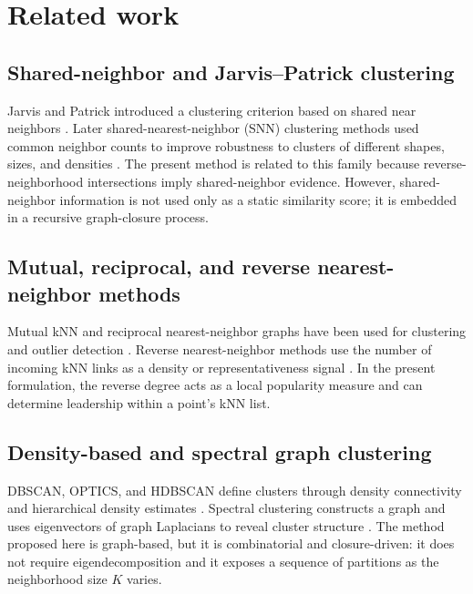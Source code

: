 \documentclass[pdflatex,sn-mathphys-num]{sn-jnl}
\theoremstyle{thmstyleone}
\theoremstyle{thmstyletwo}
\theoremstyle{thmstylethree}
\begin{document}
\section{Related work}\label{sec:related}

\subsection{Shared-neighbor and Jarvis--Patrick clustering}

Jarvis and Patrick introduced a clustering criterion based on shared near neighbors \citep{JarvisPatrick1973}. Later shared-nearest-neighbor (SNN) clustering methods used common neighbor counts to improve robustness to clusters of different shapes, sizes, and densities \citep{ErtozSteinbachKumar2003}. The present method is related to this family because reverse-neighborhood intersections imply shared-neighbor evidence. However, shared-neighbor information is not used only as a static similarity score; it is embedded in a recursive graph-closure process.

\subsection{Mutual, reciprocal, and reverse nearest-neighbor methods}

Mutual kNN and reciprocal nearest-neighbor graphs have been used for clustering and outlier detection \citep{BritoChavezQuirozYukich1997,GowdaKrishna1978,SardanaBhatnagar2014}. Reverse nearest-neighbor methods use the number of incoming kNN links as a density or representativeness signal \citep{ChowdhuryAmorim2018}. In the present formulation, the reverse degree acts as a local popularity measure and can determine leadership within a point's kNN list.

\subsection{Density-based and spectral graph clustering}

DBSCAN, OPTICS, and HDBSCAN define clusters through density connectivity and hierarchical density estimates \citep{EsterKriegelSanderXu1996,AnkerstBreunigKriegelSander1999,CampelloMoulaviSander2013,CampelloMoulaviZimekSander2015}. Spectral clustering constructs a graph and uses eigenvectors of graph Laplacians to reveal cluster structure \citep{NgJordanWeiss2002,VonLuxburg2007}. The method proposed here is graph-based, but it is combinatorial and closure-driven: it does not require eigendecomposition and it exposes a sequence of partitions as the neighborhood size $K$ varies.
\end{document}
